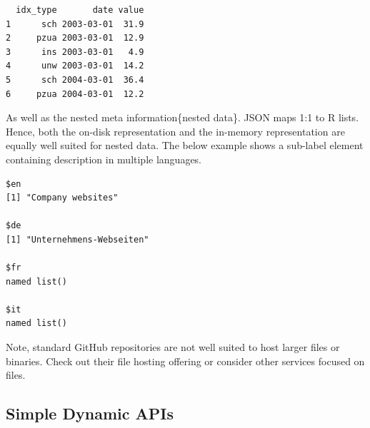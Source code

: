 \documentclass[
  12pt,
  letterpaper,
]{krantz}
\newenvironment{Shaded}{\begin{snugshade}}{\end{snugshade}}
\newcommand{\FunctionTok}[1]{\textcolor[rgb]{0.28,0.35,0.67}{#1}}
\newcommand{\NormalTok}[1]{\textcolor[rgb]{0.00,0.23,0.31}{#1}}
\newcommand{\OtherTok}[1]{\textcolor[rgb]{0.00,0.23,0.31}{#1}}
\newcommand{\SpecialCharTok}[1]{\textcolor[rgb]{0.37,0.37,0.37}{#1}}
\newcommand{\StringTok}[1]{\textcolor[rgb]{0.13,0.47,0.30}{#1}}
\begin{document}
\begin{verbatim}
  idx_type       date value
1      sch 2003-03-01  31.9
2     pzua 2003-03-01  12.9
3      ins 2003-03-01   4.9
4      unw 2003-03-01  14.2
5      sch 2004-03-01  36.4
6     pzua 2004-03-01  12.2
\end{verbatim}

As well as the nested meta information\{nested data\}. JSON maps 1:1 to
R lists. Hence, both the on-disk representation and the
in-memory representation are equally well suited for
nested data. The below example shows a sub-label element containing
description in multiple languages.

\begin{Shaded}
\end{Shaded}

\begin{verbatim}
$en
[1] "Company websites"

$de
[1] "Unternehmens-Webseiten"

$fr
named list()

$it
named list()
\end{verbatim}

\begin{tcolorbox}[enhanced jigsaw, left=2mm, arc=.35mm, colbacktitle=quarto-callout-note-color!10!white, breakable, colframe=quarto-callout-note-color-frame, bottomrule=.15mm, bottomtitle=1mm, colback=white, leftrule=.75mm, coltitle=black, toptitle=1mm, titlerule=0mm, title=\textcolor{quarto-callout-note-color}{\faInfo}\hspace{0.5em}{Note}, opacityback=0, rightrule=.15mm, toprule=.15mm, opacitybacktitle=0.6]

Note, standard GitHub repositories are not well suited to
host larger files or binaries. Check out their file hosting offering or
consider other services focused on files.

\end{tcolorbox}

\hypertarget{simple-dynamic-apis}{%
\subsection{\texorpdfstring{Simple Dynamic
APIs}{Simple Dynamic APIs}}\label{simple-dynamic-apis}}
\end{document}
